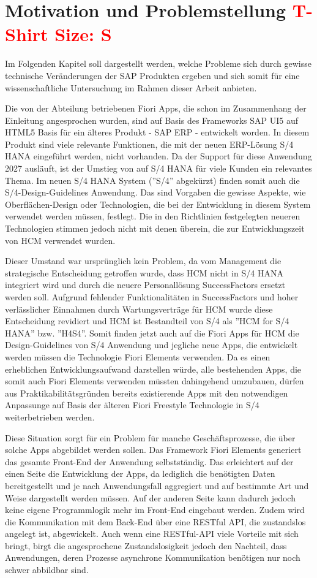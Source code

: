 \section{Motivation und Problemstellung \textcolor{red}{T-Shirt Size: S}}

Im Folgenden Kapitel soll dargestellt werden, welche Probleme sich durch gewisse technische Veränderungen der SAP Produkten ergeben und sich somit für eine wissenschaftliche Untersuchung im Rahmen dieser Arbeit anbieten.

Die von der Abteilung betriebenen Fiori Apps, die schon im Zusammenhang der Einleitung angesprochen wurden, sind auf Basis des Frameworks SAP UI5 auf HTML5 Basis für ein älteres Produkt - SAP ERP - entwickelt worden. In diesem Produkt sind viele relevante Funktionen, die mit der neuen ERP-Lösung S/4 HANA eingeführt werden, nicht vorhanden. Da der Support für diese Anwendung 2027 ausläuft, ist der Umstieg von auf S/4 HANA für viele Kunden ein relevantes Thema. Im neuen S/4 HANA System (''S/4'' abgekürzt) finden somit auch die S/4-Design-Guidelines Anwendung. Das sind Vorgaben die gewisse Aspekte, wie \zB Oberflächen-Design oder Technologien, die bei der Entwicklung in diesem System verwendet werden müssen, festlegt. Die in den Richtlinien festgelegten neueren Technologien stimmen jedoch nicht mit denen überein, die zur Entwicklungszeit von HCM verwendet wurden.

Dieser Umstand war ursprünglich kein Problem, da vom Management die strategische Entscheidung getroffen wurde, dass HCM nicht in S/4 HANA integriert wird und durch die neuere Personallösung SuccessFactors ersetzt werden soll. Aufgrund fehlender Funktionalitäten in SuccessFactors und  hoher verlässlicher Einnahmen durch Wartungsverträge für HCM wurde diese Entscheidung revidiert und HCM ist Bestandteil von S/4 als ''HCM for S/4 HANA'' bzw. ''H4S4''. Somit finden jetzt auch auf die Fiori Apps für HCM die Design-Guidelines von S/4 Anwendung und jegliche neue Apps, die entwickelt werden müssen die Technologie Fiori Elements verwenden. Da es einen erheblichen Entwicklungsaufwand darstellen würde, alle bestehenden Apps, die somit auch Fiori Elements verwenden müssten dahingehend umzubauen, dürfen aus Praktikabilitätsgründen bereits existierende Apps mit den notwendigen Anpassunge auf Basis der älteren Fiori Freestyle Technologie in S/4 weiterbetrieben werden.

Diese Situation sorgt für ein Problem für manche Geschäftsprozesse, die über solche Apps abgebildet werden sollen. Das Framework Fiori Elements generiert das gesamte Front-End der Anwendung selbstständig. Das erleichtert auf der einen Seite die Entwicklung der Apps, da lediglich die benötigten Daten bereitgestellt und je nach Anwendungsfall aggregiert und auf bestimmte Art und Weise dargestellt werden müssen. Auf der anderen Seite kann dadurch jedoch keine eigene Programmlogik mehr im Front-End eingebaut werden. Zudem wird die Kommunikation mit dem Back-End über eine RESTful API, die zustandslos angelegt ist, abgewickelt. Auch wenn eine RESTful-API viele Vorteile mit sich bringt, birgt die angesprochene Zustandslosigkeit jedoch den Nachteil, dass Anwendungen, deren Prozesse asynchrone Kommunikation benötigen nur noch schwer abbildbar sind.

